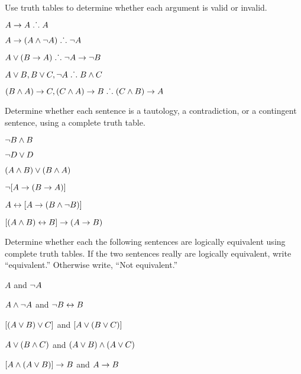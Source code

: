 \solutions
\problempart
\label{pr.TT.valid}
Use truth tables to determine whether each argument is valid or invalid.
\begin{earg}
\item $A\rightarrow A \mathrel{\ldotp\dot{}\,\ldotp} A$ %
\item $A\rightarrow(A\wedge\neg A) \mathrel{\ldotp\dot{}\,\ldotp} \neg A$ %
\item $A\vee(B\rightarrow A) \mathrel{\ldotp\dot{}\,\ldotp} \neg A \rightarrow \neg B$ %
\item $A\vee B, B\vee C, \neg A \mathrel{\ldotp\dot{}\,\ldotp} B \wedge C$ %
\item $(B\wedge A)\rightarrow C, (C\wedge A)\rightarrow B \mathrel{\ldotp\dot{}\,\ldotp} (C\wedge B)\rightarrow A$ %
\end{earg}

\problempart Determine whether each sentence is a tautology, a contradiction, or a contingent sentence, using a complete truth table.
\begin{earg}
\item $\neg B \wedge B$ \vspace{.5ex}%


\item $\neg D \vee D$ \vspace{.5ex}%


\item $(A\wedge B) \vee (B\wedge A)$\vspace{.5ex} %


\item $\neg[A \rightarrow (B \rightarrow A)]$\vspace{.5ex} %


\item $A \leftrightarrow [A \rightarrow (B \wedge \neg B)]$ \vspace{.5ex}%


\item $[(A \wedge B) \leftrightarrow B] \rightarrow (A \rightarrow B)$ \vspace{.5ex}%

\end{earg}



\noindent\problempart
\label{pr.TT.equiv}
Determine whether each the following sentences are logically equivalent using complete truth tables. If the two sentences really are logically equivalent, write ``equivalent.'' Otherwise write, ``Not equivalent.'' 
\begin{earg}
\item $A$ and $\neg A$
\item $A \wedge \neg A$ and $\neg B \leftrightarrow B$
\item $[(A \vee B) \vee C]$ and $[A \vee (B \vee C)]$
\item $A \vee (B \wedge C)$ and $(A \vee B) \wedge (A \vee C)$
\item $[A \wedge (A \vee B)] \rightarrow B$ and $A \rightarrow B$\end{earg}


